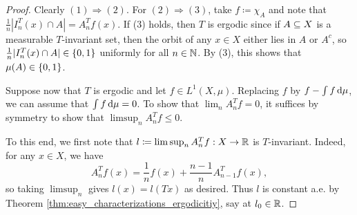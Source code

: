 \documentclass[reqno, twoside]{article}
\begin{document}
    \begin{proof}
        Clearly $(1)\Rightarrow(2)$. For $(2)\Rightarrow(3)$, take $f\coloneqq\chi_A$ and note that $\frac{1}{n}|I_n^T(x)\cap A|=A_n^Tf(x)$. If (3) holds, then $T$ is ergodic since if $A\subseteq X$ is a measurable $T$-invariant set, then the orbit of any $x\in X$ either lies in $A$ or $A^c$, so $\frac{1}{n}|I_n^T(x)\cap A|\in\left\{0,1\right\}$ uniformly for all $n\in\mathbb{N}$. By (3), this shows that $\mu(A)\in\left\{0,1\right\}$.

        Suppose now that $T$ is ergodic and let $f\in L^1(X,\mu)$. Replacing $f$ by $f-\int f\,\mathrm{d}\mu$, we can assume that $\int f\,\mathrm{d}\mu=0$. To show that $\lim_nA_n^Tf=0$, it suffices by symmetry to show that $\limsup_nA_n^Tf\leq0$.

        To this end, we first note that $l\coloneqq\limsup_nA_n^Tf:X\to\mathbb{R}$ is $T$-invariant. Indeed, for any $x\in X$, we have
        \vspace{-0.05in}
        \begin{equation*}
            A_n^Tf(x)=\frac{1}{n}f(x)+\frac{n-1}{n}A_{n-1}^Tf(x),
        \end{equation*}
        so taking $\limsup_n$ gives $l(x)=l(Tx)$ as desired. Thus $l$ is constant a.e. by Theorem \ref{thm:easy_characterizations_ergodicitiy}, say at $l_0\in\mathbb{R}$.


\end{proof}
\end{document}
